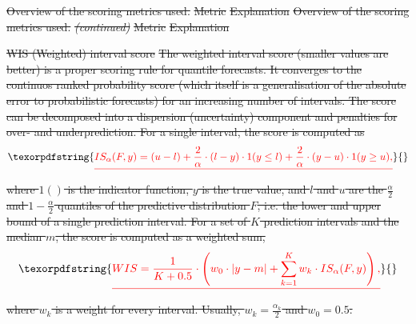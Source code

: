\documentclass[10pt,letterpaper]{article}
\providecommand{\DIFdeltex}[1]{{\protect\color{red}\sout{#1}}}                      %
\providecommand{\DIFdel}[1]{\texorpdfstring{\DIFdeltex{#1}}{}} %
\begin{document}

{%
\DIFdel{Overview of the scoring metrics used.}}%
\DIFdel{Metric }%
\DIFdel{Explanation}%
{%
\DIFdel{Overview of the scoring metrics used. }\textit{\DIFdel{(continued)}}%
}%
\DIFdel{Metric }%
\DIFdel{Explanation}%

\DIFdel{WIS (Weighted) interval score }%
\DIFdel{The weighted interval score (smaller values are better) is a proper scoring rule for quantile forecasts. It converges to the continuos ranked probability score (which itself is a generalisation of the absolute error to probabilistic forecasts) for an increasing number of intervals. The score can be decomposed into a dispersion (uncertainty) component and penalties for over- and underprediction. For a single interval, the score is computed as 
  }\begin{displaymath}\DIFdel{IS_\alpha(F,y) = (u-l) + \frac{2}{\alpha} \cdot (l-y) \cdot 1(y \leq l) + \frac{2}{\alpha} \cdot (y-u) \cdot 1(y \geq u), }\end{displaymath}%
\DIFdel{where $1()$ is the indicator function, $y$ is the true value, and $l$ and $u$ are the $\frac{\alpha}{2}$ and $1 - \frac{\alpha}{2}$ quantiles of the predictive distribution $F$, i.e. the lower and upper bound of a single prediction interval. For a set of $K$ prediction intervals and the median $m$, the score is computed as a weighted sum, 
  }\begin{displaymath}\DIFdel{WIS = \frac{1}{K + 0.5} \cdot \left( w_0 \cdot |y - m| + \sum_{k = 1}^{K} w_k \cdot IS_{\alpha}(F, y) \right), }\end{displaymath}%
\DIFdel{where $w_k$ is a weight for every interval. Usually, $w_k = \frac{\alpha_k}{2}$ and $w_0 = 0.5$. 
}%
\end{document}

